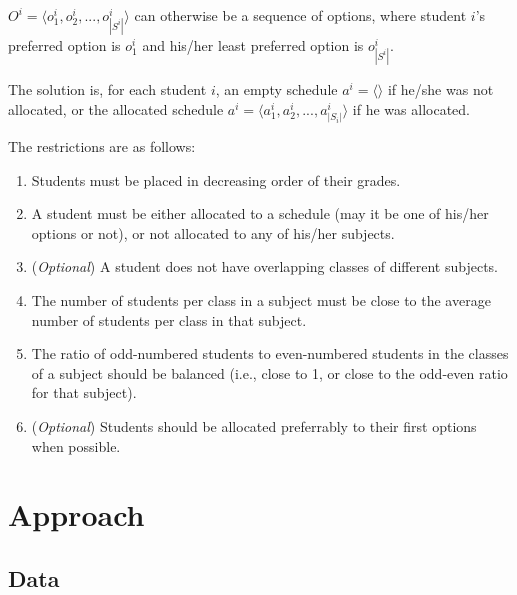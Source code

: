 \documentclass[runningheads]{llncs}
\begin{document}
$O^i = \langle o^i_1, o^i_2, ..., o^i_{|S^i|} \rangle$ can otherwise be a sequence of options, where student $i$'s preferred option is $o^i_1$ and his/her least preferred option is $o^i_ {|S^i|}$.

The solution is, for each student $i$, an empty schedule $a^i=\langle \rangle$ if he/she was not allocated, or the allocated schedule $a^i = \langle a^i_1, a^i_2, ..., a^i_{|S_i|} \rangle$ if he was allocated.

The restrictions are as follows:
\begin{enumerate}
    \item Students must be placed in decreasing order of their grades.
    \item A student must be either allocated to a schedule (may it be one of his/her options or not), or not allocated to any of his/her subjects.
    \item (\textit{Optional}) A student does not have overlapping classes of different subjects.
    \item The number of students per class in a subject must be close to the average number of students per class in that subject.
    \item The ratio of odd-numbered students to even-numbered students in the classes of a subject should be balanced (i.e., close to 1, or close to the odd-even ratio for that subject).
    \item (\textit{Optional}) Students should be allocated preferrably to their first options when possible.
\end{enumerate}

\section{Approach}

\subsection{Data}
\end{document}
